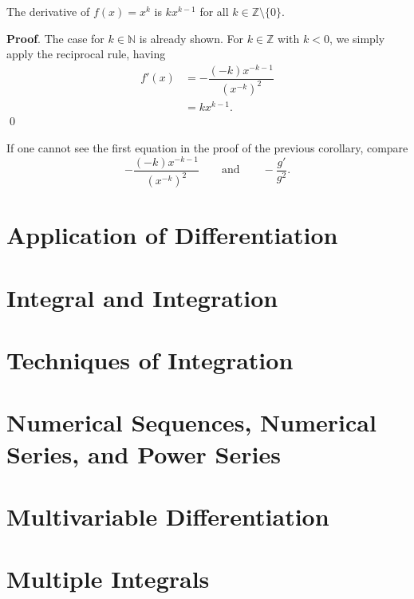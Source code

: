 \documentclass[11pt]{book}
\theoremstyle{break}
\theoremstyle{no_label}
\newcommand{\bbN}{\mathbb{N}}
\numberwithin{equation}{section}
\begin{document}
\begin{corollary}
    The derivative of $f(x)=x^k$ is $kx^{k-1}$ for all $k\in\mathbb{Z}\setminus\{0\}$.
\end{corollary}
\textbf{Proof}. The case for $k\in\bbN$ is already shown. For $k\in\mathbb{Z}$ with $k<0$, we simply apply the reciprocal rule, having \begin{align*}
    f'(x)&=-\dfrac{(-k)x^{-k-1}}{(x^{-k})^2}\\
    &=kx^{k-1}.
\end{align*} \qed

If one cannot see the first equation in the proof of the previous corollary, compare $$-\dfrac{(-k)x^{-k-1}}{(x^{-k})^2}\qquad\text{and}\qquad-\dfrac{g'}{g^2}.$$

\chapter{Application of Differentiation}



\chapter{Integral and Integration}



\chapter{Techniques of Integration}



\chapter{Numerical Sequences, Numerical Series, and Power Series}



\chapter{Multivariable Differentiation}



\chapter{Multiple Integrals}
\end{document}

